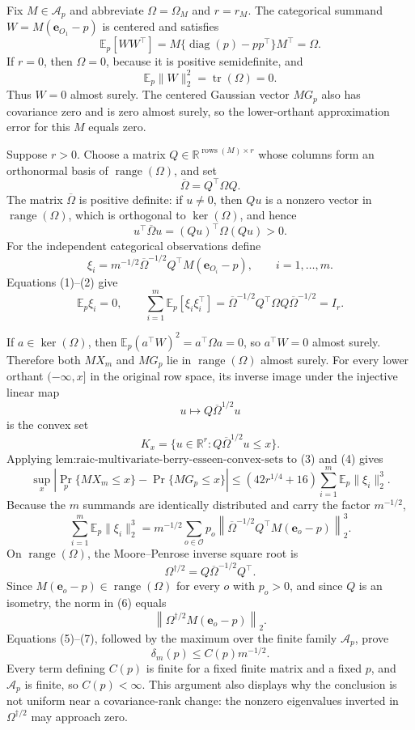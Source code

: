 Fix \(M\in\mathcal A_p\) and abbreviate \(\Omega=\Omega_M\) and \(r=r_M\).  The categorical summand \(W=M(\mathbf e_{O_1}-p)\) is centered and satisfies
\[
\mathbb E_p[WW^{\top}]=M\{\operatorname{diag}(p)-pp^{\top}\}M^{\top}=\Omega.
\tag{1}
\]
If \(r=0\), then \(\Omega=0\), because it is positive semidefinite, and
\[
\mathbb E_p\|W\|_2^2=\operatorname{tr}(\Omega)=0.
\]
Thus \(W=0\) almost surely.  The centered Gaussian vector \(MG_p\) also has covariance zero and is zero almost surely, so the lower-orthant approximation error for this \(M\) equals zero.

Suppose \(r>0\).  Choose a matrix \(Q\in\mathbb R^{\operatorname{rows}(M)\times r}\) whose columns form an orthonormal basis of \(\operatorname{range}(\Omega)\), and set
\[
\overline\Omega=Q^{\top}\Omega Q.
\]
The matrix \(\overline\Omega\) is positive definite: if \(u\neq0\), then \(Qu\) is a nonzero vector in \(\operatorname{range}(\Omega)\), which is orthogonal to \(\ker(\Omega)\), and hence
\[
u^{\top}\overline\Omega u=(Qu)^{\top}\Omega(Qu)>0.
\tag{2}
\]
For the independent categorical observations define
\[
\xi_i=m^{-1/2}\overline\Omega^{-1/2}Q^{\top}M(\mathbf e_{O_i}-p),
\qquad i=1,\ldots,m.
\]
Equations (1)--(2) give
\[
\mathbb E_p\xi_i=0,
\qquad
\sum_{i=1}^m\mathbb E_p[\xi_i\xi_i^{\top}]
=\overline\Omega^{-1/2}Q^{\top}\Omega Q\overline\Omega^{-1/2}=I_r.
\tag{3}
\]

If \(a\in\ker(\Omega)\), then \(\mathbb E_p(a^{\top}W)^2=a^{\top}\Omega a=0\), so \(a^{\top}W=0\) almost surely.  Therefore both \(MX_m\) and \(MG_p\) lie in \(\operatorname{range}(\Omega)\) almost surely.  For every lower orthant \(( -\infty,x]\) in the original row space, its inverse image under the injective linear map
\[
u\longmapsto Q\overline\Omega^{1/2}u
\]
is the convex set
\[
K_x=\{u\in\mathbb R^r:Q\overline\Omega^{1/2}u\leq x\}.
\tag{4}
\]
Applying \(\text{lem:raic-multivariate-berry-esseen-convex-sets}\) to (3) and (4) gives
\[
\sup_x\left|\Pr_p\{MX_m\leq x\}-\Pr\{MG_p\leq x\}\right|
\leq(42r^{1/4}+16)\sum_{i=1}^m\mathbb E_p\|\xi_i\|_2^3.
\tag{5}
\]
Because the \(m\) summands are identically distributed and carry the factor \(m^{-1/2}\),
\[
\sum_{i=1}^m\mathbb E_p\|\xi_i\|_2^3
=m^{-1/2}\sum_{o\in\mathcal O}p_o
\left\|\overline\Omega^{-1/2}Q^{\top}M(\mathbf e_o-p)\right\|_2^3.
\tag{6}
\]
On \(\operatorname{range}(\Omega)\), the Moore--Penrose inverse square root is
\[
\Omega^{\dagger/2}=Q\overline\Omega^{-1/2}Q^{\top}.
\]
Since \(M(\mathbf e_o-p)\in\operatorname{range}(\Omega)\) for every \(o\) with \(p_o>0\), and since \(Q\) is an isometry, the norm in (6) equals
\[
\left\|\Omega^{\dagger/2}M(\mathbf e_o-p)\right\|_2.
\tag{7}
\]
Equations (5)--(7), followed by the maximum over the finite family \(\mathcal A_p\), prove
\[
\delta_m(p)\leq C(p)m^{-1/2}.
\tag{8}
\]
Every term defining \(C(p)\) is finite for a fixed finite matrix and a fixed \(p\), and \(\mathcal A_p\) is finite, so \(C(p)<\infty\).  This argument also displays why the conclusion is not uniform near a covariance-rank change: the nonzero eigenvalues inverted in \(\Omega^{\dagger/2}\) may approach zero.

